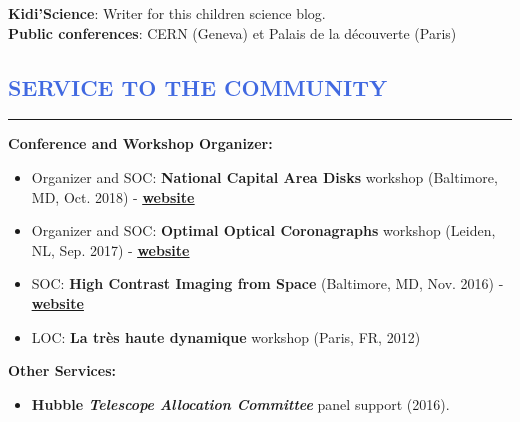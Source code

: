 \documentclass[12pt]{article}
\begin{document}
\vspace{0.5cm}
\textbf{Kidi'Science}: Writer for this children science blog.\\

\textbf{Public conferences}: CERN (Geneva) et Palais de la découverte (Paris)\\

\vspace{-0.3cm}
\textcolor{RoyalBlue}{\section{\large SERVICE TO THE COMMUNITY}
\vspace{-0.35cm}\hrule}
\vspace{0.6cm}

\parbox{0.55\linewidth}{
\textbf{Conference and Workshop Organizer:}
\begin{itemize}
 \item \small Organizer and SOC: \textbf{National Capital Area Disks} workshop (Baltimore, MD, Oct. 2018) - \href{https://sites.google.com/view/ncad7-at-jhu/ncad7}{\underline{\textbf{website}}}
 \item \small Organizer and SOC: \textbf{Optimal Optical Coronagraphs} workshop (Leiden, NL, Sep. 2017) - \href{https://www.lorentzcenter.nl/lc/web/2017/924/info.php3?wsid=924&venue=Snellius}{\underline{\textbf{website}}}
 \item \small SOC: \textbf{High Contrast Imaging from Space} (Baltimore, MD, Nov. 2016) - \href{http://www.cvent.com/events/high-contrast-imaging-in-space-workshop/event-summary-eb3bb6bd54a342c5a15678daa49be683.aspx}{\underline{\textbf{website}}}
 \item \small LOC: \textbf{La très haute dynamique} workshop (Paris, FR, 2012)
\end{itemize}
\vspace{0.4cm}
\textbf{Other Services:}
\begin{itemize}
    \item \small \textbf{Hubble \textit{Telescope Allocation Committee}} panel support (2016).
\end{itemize}}
\hspace{0.2cm}
\end{document}
